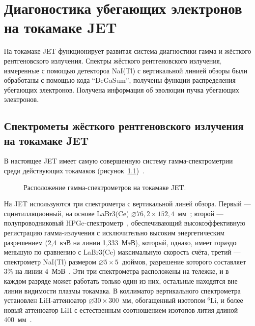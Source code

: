 \chapter{Диагоностика убегающих электронов на токамаке JET}
\label{sec:asdex}

На токамаке JET функционирует развитая система диагностики гамма и жёсткого рентгеновского излучения. Спектры жёсткого рентгеновского излучения, измеренные с помощью детектороа NaI(Tl) с вертикальной линией обзоры были обработаны с помощью кода ``DeGaSum'', получены функции распределения убегающих электронов. Получена информация об эволюции пучка убегающих электронов. 


\section{Спектрометы жёсткого рентгеновского излучения на токамаке JET}

В настоящее JET имеет самую совершенную систему гамма-спектрометрии среди действующих токамаков (рисунок~\ref{fig:jetHxrDetectorsScheme})~\cite{Iliasova2022}. 

\begin{figure}[ht!]
  \caption{ Расположение гамма-спектрометров на токамаке JET.~\cite{Iliasova2022} }
  \label{fig:jetHxrDetectorsScheme}
\end{figure}

На JET используются три спектрометра с вертикальной линей обзора. Первый --- сцинтилляционный, на основе LaBr3(Ce) $\varnothing 76,2 \times 152,4$~мм~\cite{Nocente2010}; второй --- полупроводниковый HPGe-спектрометр~\cite{Tardocchi2011}, обеспечивающий высокоэффективную регистрацию гамма-излучения с исключительно высоким энергетическим разрешением (2,4~кэВ на линии 1,333~МэВ), который, однако, имеет гораздо меньшую по сравнению с LaBr3(Ce) максимальную скорость счёта, третий --- спектрометр NaI(Tl) размером $\varnothing 5 \times 5$~дюймов, разрешение которого составляет 3\% на линии 4~МэВ~\cite{Tardocchi2008}. Эти три спектрометра расположены на тележке, и в каждом разряде может работать только один из них, остальные находятся вне линии видимости плазмы токамака. В коллиматор вертикального спектрометра установлен LiH-аттенюатор $\varnothing 30 \times 300$~мм, обогащенный изотопом ${}^6$Li, и более новый аттенюатор LiH с естественным соотношением изотопов лития длиной 400~мм~\cite{Murari2008}.

